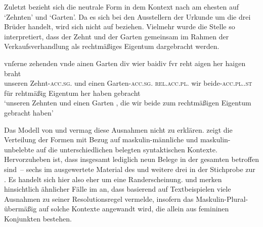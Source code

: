 
Zuletzt bezieht sich die neutrale Form  in 
dem Kontext nach am ehesten auf  `Zehnten' und 
`Garten'. Da es sich bei den Ausstellern der Urkunde um die drei Brüder
\autocites(Nrn.~1201~AB)[472,6--7]{cao2} handelt, wird sich  nicht
auf  beziehen. Vielmehr wurde die Stelle so interpretiert, dass der
Zehnt und der Garten gemeinsam im Rahmen der Verkaufsverhandlung als
rechtmäßiges Eigentum dargebracht werden.

\begin{exe}
\ex \label{ex:m+m_beidiu_5}
	\gll vnſerne zehenden \textelp{} vnde ainen Garten \textelp{} div wier
			baidiv fvr reht aigen her haigen braht \\
		unseren Zehnt-\textsc{acc.sg.\MascI} {} und einen
		Garten-\textsc{acc.sg.\MascI} {} \textsc{rel.acc.pl.\NeutI} wir
		beide-\textsc{acc.pl.\NeutI.st} für rehtmäßig Eigentum her haben
		gebracht \\
	\trans `unseren Zehnten \textelp{} und einen Garten \textelp{}, die wir
		beide zum rechtmäßigen Eigentum gebracht haben'
		\parencites(Nrn.~1201~AB, Kl.~Heiligkreuztal, Kr.~Biberach, 1290)[472,10--14]{cao2}
\end{exe}

Das Modell von \citet{wechsler2009} und \citet{wechslerzlatic2003} vermag diese
Ausnahmen nicht zu erklären.  zeigt die
Verteilung der Formen mit Bezug auf maskulin-männliche und
maskulin-unbelebte  auf die unterschiedlichen
belegten syntaktischen Kontexte. Hervorzuheben ist, dass insgesamt lediglich
neun Belege in der gesamten  betroffen sind~-- sechs im
ausgewertete Material des \CAO{} und weitere drei in der Stichprobe zur \KC{}.
Es handelt sich hier also eher um eine Randerscheinung.
\citet[581]{wechsler2009} und \citet[190]{wechslerzlatic2003} merken
hinsichtlich ähnlicher Fälle im  an, dass
\citet{corbett1983,corbett1991} basierend auf Textbeispielen viele Ausnahmen zu
seiner Resolutionsregel vermelde, insofern das Maskulin-Plural-
übermäßig auf solche Kontexte angewandt wird, die allein aus
femininen Konjunkten bestehen.

